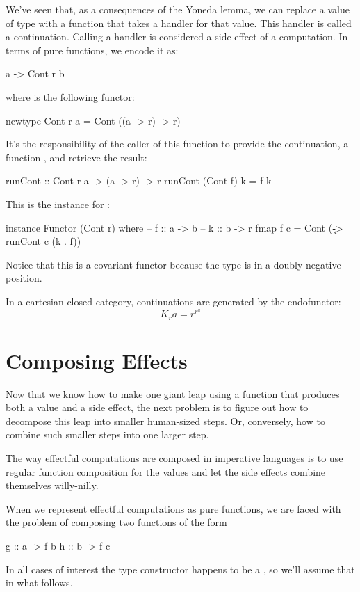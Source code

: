 \documentclass[DaoFP]{subfiles}
\begin{document}
We've seen that, as a consequences of the Yoneda lemma, we can replace a value of type  with a function that takes a handler for that value. This handler is called a continuation. Calling a handler is considered a side effect of a computation. In terms of pure functions, we encode it as:
\begin{haskell}
a -> Cont r b
\end{haskell}
where  is the following functor:
\begin{haskell}
newtype Cont r a = Cont ((a -> r) -> r)
\end{haskell}
It's the responsibility of the caller of this function to provide the continuation, a function , and retrieve the result:
\begin{haskell}
runCont :: Cont r a -> (a -> r) -> r
runCont (Cont f) k = f k
\end{haskell}

This is the  instance for :
\begin{haskell}
instance Functor (Cont r) where
  -- f :: a -> b
  -- k :: b -> r
  fmap f c = Cont (\k -> runCont c (k . f))
\end{haskell}
Notice that this is a covariant functor because the type  is in a doubly negative position.

In a cartesian closed category, continuations are generated by the endofunctor:
\[ K_r a = r^{r^a} \]

\section{Composing Effects}

Now that we know how to make one giant leap using a function that produces both a value and a side effect, the next problem is to figure out how to decompose this leap into smaller human-sized steps. Or, conversely, how to combine such smaller steps into one larger step. 

The way effectful computations are composed in imperative languages is to use regular function composition for the values and let the side effects combine themselves willy-nilly. 

When we represent effectful computations as pure functions, we are faced with the problem of composing two functions of the form
\begin{haskell}
g :: a -> f b
h :: b -> f c
\end{haskell}
In all cases of interest the type constructor  happens to be a , so we'll assume that in what follows.
\end{document}
